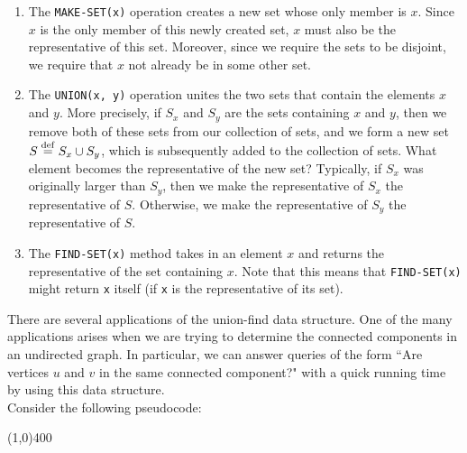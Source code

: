 \begin{enumerate}
    \item The \verb!MAKE-SET(x)! operation creates a new set whose only member is $x$. Since $x$ is the only member of this newly created set, $x$ must also be the representative of this set. Moreover, since we require the sets to be disjoint, we require that $x$ not already be in some other set.
    \item The \verb!UNION(x, y)! operation unites the two sets that contain the elements $x$ and $y$. More precisely, if $S_x$ and $S_y$ are the sets containing $x$ and $y$, then we remove both of these sets from our collection of sets, and we form a new set $S \overset{\mathrm{def}}{=} S_x \cup S_y$, which is subsequently added to the collection of sets. What element becomes the representative of the new set? Typically, if $S_x$ was originally larger than $S_y$, then we make the representative of $S_x$ the representative of $S$. Otherwise, we make the representative of $S_y$ the representative of $S$.
    \item The \verb!FIND-SET(x)! method takes in an element $x$ and returns the representative of the set containing $x$. Note that this means that \verb!FIND-SET(x)! might return \verb!x! itself (if \verb!x! is the representative of its set). 
\end{enumerate}


There are several applications of the union-find data structure. One of the many applications arises when we are trying to determine the connected components in an undirected graph. In particular, we can answer queries of the form ``Are vertices $u$ and $v$ in the same connected component?" with a quick running time by using this data structure. \\


Consider the following pseudocode: 

\vspace{1em}
\begin{center}
\line(1,0){400}
\end{center}

